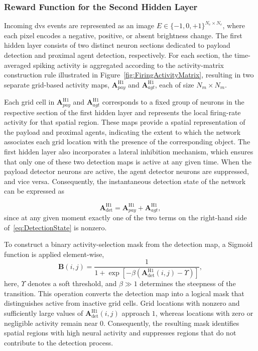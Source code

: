 \subsubsection{Reward Function for the Second Hidden Layer}

Incoming \ac{dvs} events are represented as an image $E \in \{-1,0,+1\}^{N_e \times N_e}$, where each pixel encodes a negative, positive, or absent brightness change. The first hidden layer consists of two distinct neuron sections dedicated to payload detection and proximal agent detection, respectively. For each section, the time-averaged spiking activity is aggregated according to the activity-matrix construction rule illustrated in Figure~\ref{fig:FiringActivityMatrix}, resulting in two separate grid-based activity maps, $\mathbf{A}_{pay}^{\text{H1}}$ and $\mathbf{A}_{agt}^{\text{H1}}$, each of size $N_m \times N_m$.

Each grid cell in $\mathbf{A}_{pay}^{\text{H1}}$ and $\mathbf{A}_{agt}^{\text{H1}}$ corresponds to a fixed group of neurons in the respective section of the first hidden layer and represents the local firing-rate activity for that spatial region. These maps provide a spatial representation of the payload and proximal agents, indicating the extent to which the network associates each grid location with the presence of the corresponding object. The first hidden layer also incorporates a lateral inhibition mechanism, which ensures that only one of these two detection maps is active at any given time. When the payload detector neurons are active, the agent detector neurons are suppressed, and vice versa. Consequently, the instantaneous detection state of the network can be expressed as

\begin{equation}
    \mathbf{A}^{\text{H1}}_{\mathrm{det}} = \mathbf{A}_{pay}^{\text{H1}} + \mathbf{A}_{agt}^{\text{H1}},
    \label{eq:DetectionState}
\end{equation}
since at any given moment exactly one of the two terms on the right-hand side of~\eqref{eq:DetectionState} is nonzero.


To construct a binary activity-selection mask from the detection map, a Sigmoid function is applied element-wise,
\begin{equation}
    \mathbf{B}(i,j) =
    \frac{1}{1 + \exp\!\left[-\beta\left(\mathbf{A}^{\text{H1}}_{\mathrm{det}}(i,j)-\Upsilon\right)\right]},
    \label{eq:BinaryMask}
\end{equation}
here, $\Upsilon$ denotes a soft threshold, and $\beta \gg 1$ determines the steepness of the transition. This operation converts the detection map into a logical mask that distinguishes active from inactive grid cells. Grid locations with nonzero and sufficiently large values of $\mathbf{A}^{\text{H1}}_{\mathrm{det}}(i,j)$ approach $1$, whereas locations with zero or negligible activity remain near $0$. Consequently, the resulting mask identifies spatial regions with high neural activity and suppresses regions that do not contribute to the detection process.


